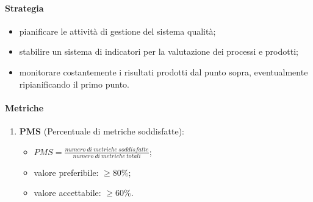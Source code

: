         \paragraph{Strategia}
            \begin{itemize}
                \item pianificare le attività di gestione del sistema qualità;
                \item stabilire un sistema di indicatori per la valutazione dei processi e prodotti;
                \item monitorare costantemente i risultati prodotti dal punto sopra, eventualmente ripianificando il primo punto.
            \end{itemize}
        \paragraph{Metriche}
        \begin{enumerate}
        \item \textbf{PMS} (Percentuale di metriche soddisfatte):
        \begin{itemize}
            \item $PMS = \frac{numero\ di\ metriche\ soddisfatte}{numero\ di\ metriche\ totali}$;
            \item valore preferibile: $\geq 80\%$;
            \item valore accettabile: $\geq 60\%$.
        \end{itemize}
    \end{enumerate}